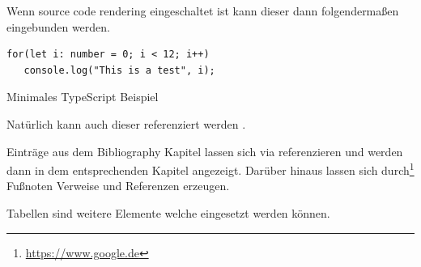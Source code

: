 \FloatBarrier

Wenn source code rendering eingeschaltet ist kann dieser dann folgendermaßen eingebunden werden.

\begin{listing}[htb]
   \begin{verbatim}
for(let i: number = 0; i < 12; i++)
   console.log("This is a test", i);
   \end{verbatim}
   \caption{Minimales TypeScript Beispiel}
   \ownsource
   \label{lis:ts-example}
\end{listing}

Natürlich kann auch dieser referenziert werden .

Einträge aus dem Bibliography Kapitel lassen sich via\autocite{tensorflowTut2022} referenzieren und werden dann in dem entsprechenden Kapitel angezeigt.
Darüber hinaus lassen sich durch\footnote{\url{https://www.google.de}} Fußnoten Verweise und Referenzen erzeugen.

Tabellen sind weitere Elemente welche eingesetzt werden können.

